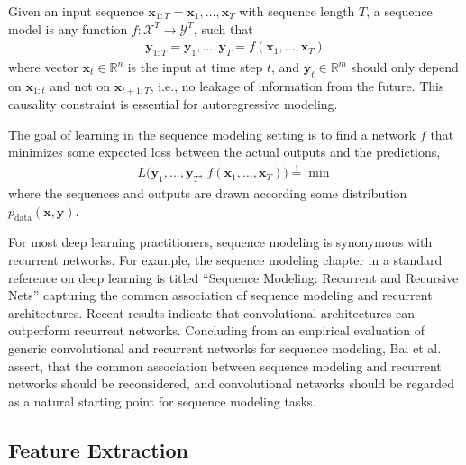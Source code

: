 \documentclass{scrartcl}
\begin{document}
Given an input sequence $\mathbf x_{1:T} = \mathbf x_1, \dots, \mathbf x_T$ with sequence length $T$, a sequence model is any function $f: \mathcal X^T \rightarrow \mathcal Y^T$, such that
\begin{align}
\mathbf y_{1:T} = \mathbf y_1, \dots, \mathbf y_T = f(\mathbf x_1,\dots, \mathbf x_T)
\end{align}
where vector $\mathbf x_t \in \mathbb R^n$ is the input at time step $t$, and $\mathbf y_t \in \mathbb R^m$ should only depend on $\mathbf x_{1:t}$ and not on $\mathbf x_{t+1:T}$, i.e., no leakage of information from the future. This causality constraint is essential for autoregressive modeling. 


The goal of learning in the sequence modeling setting is to find a network $f$ that minimizes some expected loss between the actual outputs and the predictions, 
\begin{align}
L \big( \mathbf y_1, \dots, \mathbf y_T, \, f(\mathbf x_1,\dots, \mathbf x_T) \big) \stackrel{\text{!}}{=} \min
\end{align}
where the sequences and outputs are drawn according some distribution $p_{\text{data}}(\mathbf x,\mathbf y)$.

For most deep learning practitioners, sequence modeling is synonymous with recurrent networks. For example, the sequence modeling chapter in a standard reference on deep learning is titled ``Sequence Modeling: Recurrent and Recursive Nets'' \cite{Goodfellow2016} capturing the common association of sequence modeling and recurrent architectures. Recent results indicate that convolutional architectures can outperform recurrent networks. Concluding from an empirical evaluation of generic convolutional and recurrent networks for sequence modeling, Bai et al. \cite{Bai2018} assert, that the common association between sequence modeling and recurrent networks should be reconsidered, and convolutional networks should be regarded as a natural starting point for sequence modeling tasks.



\subsection{Feature Extraction}
\end{document}
